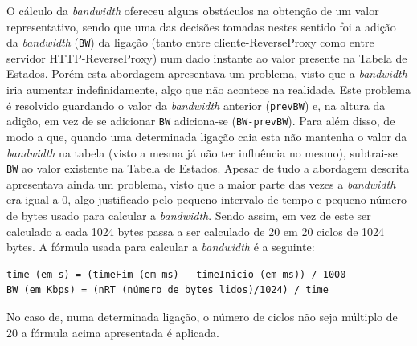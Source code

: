 \documentclass{article}
\begin{document}
O cálculo da \textit{bandwidth} ofereceu alguns obstáculos na obtenção de um valor representativo, sendo que uma das decisões tomadas nestes sentido foi a adição da \textit{bandwidth} (\texttt{BW}) da ligação (tanto entre cliente-ReverseProxy como entre servidor HTTP-ReverseProxy) num dado instante ao valor presente na Tabela de Estados. Porém esta abordagem apresentava um problema, visto que a \textit{bandwidth} iria aumentar indefinidamente, algo que não acontece na realidade. Este problema é resolvido guardando o valor da \textit{bandwidth} anterior (\texttt{prevBW}) e, na altura da adição, em vez de se adicionar \texttt{BW} adiciona-se (\texttt{BW-prevBW}). Para além disso, de modo a que, quando uma determinada ligação caia esta não mantenha o valor da \textit{bandwidth} na tabela (visto a mesma já não ter influência no mesmo), subtrai-se \texttt{BW} ao valor existente na Tabela de Estados. Apesar de tudo a abordagem descrita apresentava ainda um problema, visto que a maior parte das vezes a \textit{bandwidth} era igual a 0, algo justificado pelo pequeno intervalo de tempo e pequeno número de bytes usado para calcular a \textit{bandwidth}. Sendo assim, em vez de este ser calculado a cada 1024 bytes passa a ser calculado de 20 em 20 ciclos de 1024 bytes. A fórmula usada para calcular a \textit{bandwidth} é a seguinte:
\begin{verbatim}
time (em s) = (timeFim (em ms) - timeInicio (em ms)) / 1000
BW (em Kbps) = (nRT (número de bytes lidos)/1024) / time
\end{verbatim}
No caso de, numa determinada ligação, o número de ciclos  não seja múltiplo de 20 a fórmula acima apresentada é aplicada.
\end{document}

